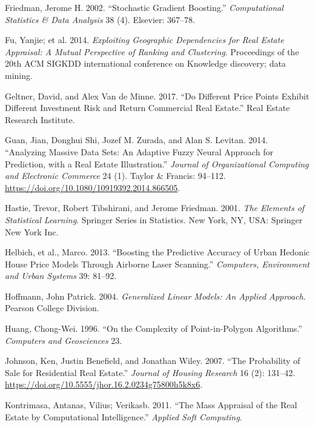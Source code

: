 \documentclass[12pt,]{article}
\begin{document}
\leavevmode\hypertarget{ref-friedman2002stochastic}{}%
Friedman, Jerome H. 2002. ``Stochastic Gradient Boosting.''
\emph{Computational Statistics \& Data Analysis} 38 (4). Elsevier:
367--78.

\leavevmode\hypertarget{ref-Fu2014}{}%
Fu, Yanjie; et al. 2014. \emph{Exploiting Geographic Dependencies for
Real Estate Appraisal: A Mutual Perspective of Ranking and Clustering}.
Proceedings of the 20th ACM SIGKDD international conference on Knowledge
discovery; data mining.

\leavevmode\hypertarget{ref-Geltner2017}{}%
Geltner, David, and Alex Van de Minne. 2017. ``Do Different Price Points
Exhibit Different Investment Risk and Return Commercial Real Estate.''
Real Estate Research Institute.

\leavevmode\hypertarget{ref-Guan2014}{}%
Guan, Jian, Donghui Shi, Jozef M. Zurada, and Alan S. Levitan. 2014.
``Analyzing Massive Data Sets: An Adaptive Fuzzy Neural Approach for
Prediction, with a Real Estate Illustration.'' \emph{Journal of
Organizational Computing and Electronic Commerce} 24 (1). Taylor \&
Francis: 94--112. \url{https://doi.org/10.1080/10919392.2014.866505}.

\leavevmode\hypertarget{ref-hastie01statisticallearning}{}%
Hastie, Trevor, Robert Tibshirani, and Jerome Friedman. 2001. \emph{The
Elements of Statistical Learning}. Springer Series in Statistics. New
York, NY, USA: Springer New York Inc.

\leavevmode\hypertarget{ref-Helbich2013}{}%
Helbich, et al., Marco. 2013. ``Boosting the Predictive Accuracy of
Urban Hedonic House Price Models Through Airborne Laser Scanning.''
\emph{Computers, Environment and Urban Systems} 39: 81--92.

\leavevmode\hypertarget{ref-hoffmann2004generalized}{}%
Hoffmann, John Patrick. 2004. \emph{Generalized Linear Models: An
Applied Approach}. Pearson College Division.

\leavevmode\hypertarget{ref-Huang1996}{}%
Huang, Chong-Wei. 1996. ``On the Complexity of Point-in-Polygon
Algorithms.'' \emph{Computers and Geosciences} 23.

\leavevmode\hypertarget{ref-Johnson2007}{}%
Johnson, Ken, Justin Benefield, and Jonathan Wiley. 2007. ``The
Probability of Sale for Residential Real Estate.'' \emph{Journal of
Housing Research} 16 (2): 131--42.
\url{https://doi.org/10.5555/jhor.16.2.0234g75800h5k8x6}.

\leavevmode\hypertarget{ref-Kontrimasa2011}{}%
Kontrimasa, Antanas, Vilius; Verikasb. 2011. ``The Mass Appraisal of the
Real Estate by Computational Intelligence.'' \emph{Applied Soft
Computing}.
\end{document}
